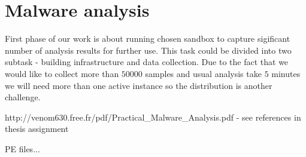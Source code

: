 \chapter{Malware analysis}
First phase of our work is about running chosen sandbox to capture sigificant number of analysis results for further use. This task could be divided into two subtask - building infrastructure and data collection. Due to the fact that we would like to collect more than $50 000$ samples and usual analysis take $5$ minutes we will need more than one active instance so the distribution is another challenge.

http://venom630.free.fr/pdf/Practical_Malware_Analysis.pdf
- see references in thesis assignment

PE files...